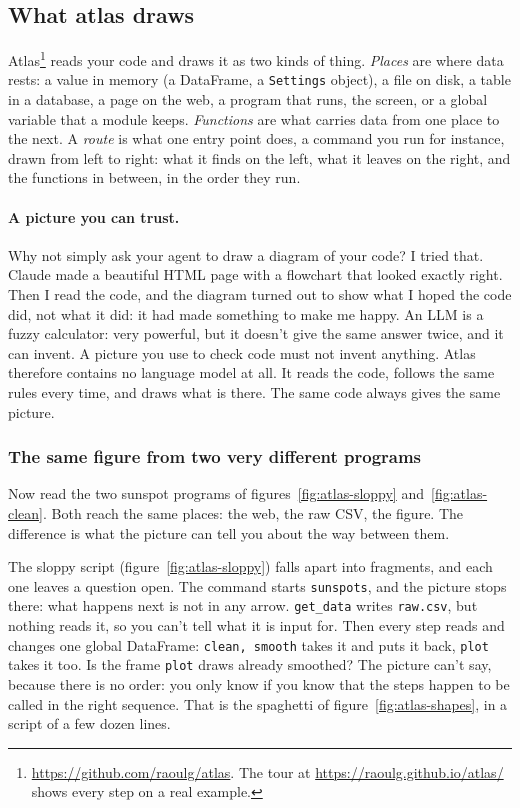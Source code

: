 \documentclass[12pt, a4paper]{article}
\theoremstyle{definition}
\theoremstyle{remark}
\begin{document}
\subsection{What atlas draws}
\label{sec:atlas-draws}
Atlas\footnote{\url{https://github.com/raoulg/atlas}. The tour at \url{https://raoulg.github.io/atlas/} shows every step on a real example.} reads your code and draws it as two kinds of thing. \emph{Places} are where data rests: a value in memory (a DataFrame, a \texttt{Settings} object), a file on disk, a table in a database, a page on the web, a program that runs, the screen, or a global variable that a module keeps. \emph{Functions} are what carries data from one place to the next. A \emph{route} is what one entry point does, a command you run for instance, drawn from left to right: what it finds on the left, what it leaves on the right, and the functions in between, in the order they run.

\paragraph{A picture you can trust.}
Why not simply ask your agent to draw a diagram of your code? I tried that. Claude made a beautiful HTML page with a flowchart that looked exactly right. Then I read the code, and the diagram turned out to show what I hoped the code did, not what it did: it had made something to make me happy. An LLM is a fuzzy calculator: very powerful, but it doesn't give the same answer twice, and it can invent. A picture you use to check code must not invent anything. Atlas therefore contains no language model at all. It reads the code, follows the same rules every time, and draws what is there. The same code always gives the same picture.

\subsubsection{The same figure from two very different programs}
Now read the two sunspot programs of figures~\ref{fig:atlas-sloppy} and~\ref{fig:atlas-clean}. Both reach the same places: the web, the raw CSV, the figure. The difference is what the picture can tell you about the way between them.

The sloppy script (figure~\ref{fig:atlas-sloppy}) falls apart into fragments, and each one leaves a question open. The command starts \texttt{sunspots}, and the picture stops there: what happens next is not in any arrow. \texttt{get\_data} writes \texttt{raw.csv}, but nothing reads it, so you can't tell what it is input for. Then every step reads and changes one global DataFrame: \texttt{clean, smooth} takes it and puts it back, \texttt{plot} takes it too. Is the frame \texttt{plot} draws already smoothed? The picture can't say, because there is no order: you only know if you know that the steps happen to be called in the right sequence. That is the spaghetti of figure~\ref{fig:atlas-shapes}, in a script of a few dozen lines.
\end{document}
